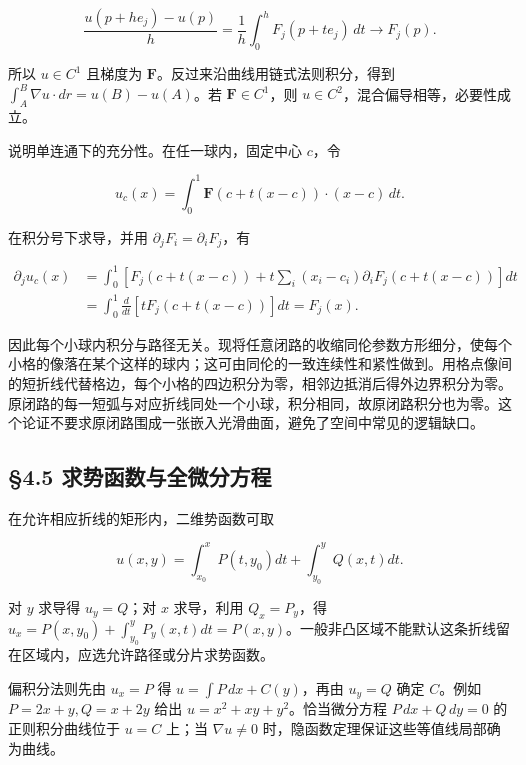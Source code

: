 \documentclass[11pt,a4paper]{article}
\begin{document}
\begin{equation*}
 \frac{u(p+he_j)-u(p)}h
 =\frac1h\int_0^hF_j(p+te_j)\,dt\longrightarrow F_j(p).
\end{equation*}

所以 \(u\in C^1\) 且梯度为
\(\mathbf F\)。反过来沿曲线用链式法则积分，得到
\(\int_A^B\nabla u\cdot dr=u(B)-u(A)\)。若 \(\mathbf F\in C^1\)，则
\(u\in C^2\)，混合偏导相等，必要性成立。

说明单连通下的充分性。在任一球内，固定中心 \(c\)，令

\begin{equation*}
 u_c(x)=\int_0^1\mathbf F(c+t(x-c))\cdot(x-c)\,dt.
\end{equation*}

在积分号下求导，并用 \(\partial_jF_i=\partial_iF_j\)，有

\begin{equation*}
\begin{aligned}
 \partial_ju_c(x)
 &=\int_0^1\left[F_j(c+t(x-c))
 +t\sum_i(x_i-c_i)\partial_iF_j(c+t(x-c))\right]dt\\
 &=\int_0^1\frac d{dt}\left[tF_j(c+t(x-c))\right]dt=F_j(x).
\end{aligned}
\end{equation*}

因此每个小球内积分与路径无关。现将任意闭路的收缩同伦参数方形细分，使每个小格的像落在某个这样的球内；这可由同伦的一致连续性和紧性做到。用格点像间的短折线代替格边，每个小格的四边积分为零，相邻边抵消后得外边界积分为零。原闭路的每一短弧与对应折线同处一个小球，积分相同，故原闭路积分也为零。这个论证不要求原闭路围成一张嵌入光滑曲面，避免了空间中常见的逻辑缺口。

\subsection{§4.5
求势函数与全微分方程}\label{ux6c42ux52bfux51fdux6570ux4e0eux5168ux5faeux5206ux65b9ux7a0b}

在允许相应折线的矩形内，二维势函数可取

\begin{equation*}
 u(x,y)=\int_{x_0}^{x}P(t,y_0)dt+\int_{y_0}^{y}Q(x,t)dt.\tag{4.6}
\end{equation*}

对 \(y\) 求导得 \(u_y=Q\)；对 \(x\) 求导，利用 \(Q_x=P_y\)，得
\(u_x=P(x,y_0)+\int_{y_0}^yP_y(x,t)dt=P(x,y)\)。一般非凸区域不能默认这条折线留在区域内，应选允许路径或分片求势函数。

偏积分法则先由 \(u_x=P\) 得 \(u=\int P\,dx+C(y)\)，再由 \(u_y=Q\) 确定
\(C\)。例如 \(P=2x+y,Q=x+2y\) 给出 \(u=x^2+xy+y^2\)。恰当微分方程
\(P\,dx+Q\,dy=0\) 的正则积分曲线位于 \(u=C\) 上；当 \(\nabla u\ne0\)
时，隐函数定理保证这些等值线局部确为曲线。
\end{document}
